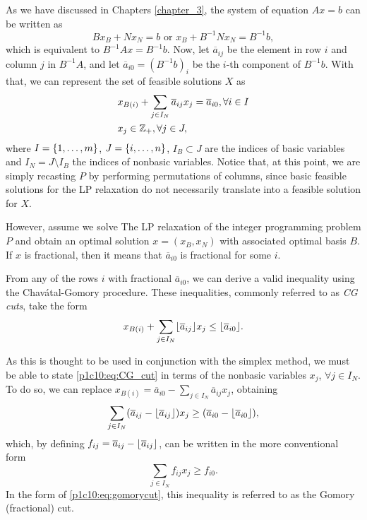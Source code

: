 As we have discussed in Chapters \ref{chapter_3}, the system of equation $Ax= b$ can be written as
%
\begin{equation*}
	Bx_B + Nx_N = b \text{ or } x_B + B^{-1}Nx_N = B^{-1}b,
\end{equation*}
%
which is equivalent to $B^{-1}Ax = B^{-1}b$. Now, let $\overline{a}_{ij}$ be the element in row $i$ and column $j$ in $B^{-1}A$, and let $\overline{a}_{i0} = (B^{-1}b)_i$ be the $i$-th component of $B^{-1}b$. With that, we can represent the set of feasible solutions $X$ as
%
\begin{align*}
	&x_{B(i)} + \sum_{j \in I_N} \overline{a}_{ij}x_j = \overline{a}_{i0},  \forall i \in I\\
	&x_j \in \mathbb{Z}_+, \forall j \in J,
\end{align*}
%
where $I = \left\{ 1, \dots, m \right \}$, $J = \left\{ i, \dots, n \right \}$, $I_B \subset J$ are the indices of basic variables and $I_N = J \setminus I_B$ the indices of nonbasic variables. Notice that, at this point, we are simply recasting $P$ by performing permutations of columns, since basic feasible solutions for the LP relaxation do not necessarily translate into a feasible solution for $X$.

However, assume we solve The LP relaxation of the integer programming problem $P$ and obtain an optimal solution $x = (x_B, x_N)$ with associated optimal basis $B$. If $x$ is fractional, then it means that $\overline{a}_{i0}$ is fractional for some $i$.

From any of the rows $i$ with fractional $\overline{a}_{i0}$, we can derive a valid inequality using the Chav\'atal-Gomory procedure. These inequalities, commonly referred to as \emph{CG cuts}, take the form
%
\begin{equation}
	x_{B(i)} + \sum_{j \in I_N} \lfloor \overline{a}_{ij} \rfloor x_j \leq \lfloor \overline{a}_{i0} \rfloor. \label{p1c10:eq:CG_cut}	
\end{equation}

As this is thought to be used in conjunction with the simplex method, we must be able to state \eqref{p1c10:eq:CG_cut} in terms of the nonbasic variables $x_j$, $\forall j \in I_N$. To do so, we can replace $x_{B(i)} = \overline{a}_{i0} - \sum_{j \in I_N} \overline{a}_{ij}x_j$, obtaining 
%
\begin{equation*}
	\sum_{j \in I_N} (\overline{a}_{ij} - \lfloor \overline{a}_{ij} \rfloor)x_j \geq (\overline{a}_{i0} - \lfloor \overline{a}_{i0} \rfloor),
\end{equation*}
%
which, by defining $f_{ij} = \overline{a}_{ij} - \lfloor \overline{a}_{ij} \rfloor$, can be written in the more conventional form
%
\begin{equation}
	\sum_{j \in I_N} f_{ij}x_j \geq f_{i0}. \label{p1c10:eq:gomorycut}
\end{equation}
%
In the form of \eqref{p1c10:eq:gomorycut}, this inequality is referred to as the Gomory (fractional) cut. 

